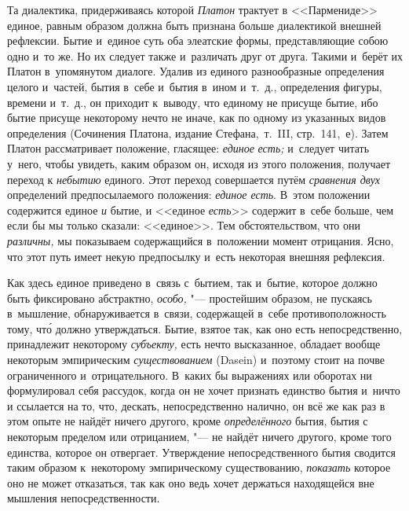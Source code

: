 Та диалектика, придерживаясь которой {\em Платон} трактует в <<Пармениде>>
единое, равным образом должна быть признана больше диалектикой внешней
рефлексии. Бытие и~единое суть оба элеатские формы, представляющие собою одно
и~то же. Но их следует также и~различать друг от друга. Такими и~берёт их
Платон в~упомянутом диалоге. Удалив из единого разнообразные определения целого
и~частей, бытия в~себе и~бытия в~ином и~т.~д., определения фигуры, времени
и~т.~д., он приходит к~выводу, что единому не присуще бытие, ибо бытие присуще
некоторому нечто не иначе, как по одному из указанных видов определения
(Сочинения Платона, издание Стефана,~т.~III, стр.~141,~е). Затем Платон
рассматривает положение, гласящее: {\em единое} {\em есть;} и~следует читать
у~него, чтобы увидеть, каким образом он, исходя из этого положения, получает
переход к {\em небытию} единого. Этот переход совершается путём {\em сравнения
двух} определений предпосылаемого положения: {\em единое есть}. В~этом
положении содержится единое {\em и} бытие, и <<единое {\em есть}>> содержит в~себе
больше, чем если бы мы только сказали: <<единое>>. Тем обстоятельством, что они
{\em различны,} мы показываем содержащийся в~положении момент отрицания. Ясно, что
этот путь имеет некую предпосылку и~есть некоторая внешняя рефлексия.

Как здесь единое приведено в~связь с~бытием, так и~бытие, которое должно быть
фиксировано абстрактно, {\em особо,} "--- простейшим образом, не пускаясь
в~мышление, обнаруживается в~связи, содержащей в~себе противоположность тому,
чт\'{о} должно утверждаться. Бытие, взятое так, как оно есть непосредственно,
принадлежит некоторому {\em субъекту,} есть нечто высказанное, обладает вообще
некоторым эмпирическим {\em существованием} (Dasein) и~поэтому стоит на почве
ограниченного и~отрицательного. В~каких бы выражениях или оборотах ни
формулировал себя рассудок, когда он не хочет признать единство бытия и~ничто и
ссылается на то, что, дескать, непосредственно налично, он всё же как раз в
этом опыте не найдёт ничего другого, кроме {\em определённого} бытия, бытия с
некоторым пределом или отрицанием, "--- не найдёт ничего другого, кроме того
единства, которое он отвергает. Утверждение непосредственного бытия сводится
таким образом к~некоторому эмпирическому существованию, {\em показать} которое
оно не может отказаться, так как оно ведь хочет держаться находящейся вне
мышления непосредственности.

